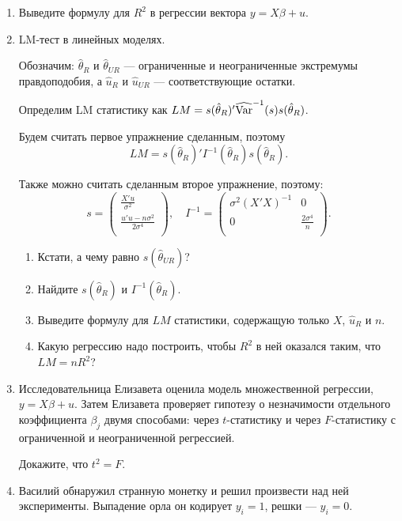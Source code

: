 \documentclass[12pt, a4paper]{article}\usepackage[]{graphicx}\usepackage[]{color}
\begin{document}
\begin{enumerate}
\item Выведите формулу для $R^2$ в регрессии вектора $y=X\beta+u$.

\item LM-тест в линейных моделях.

Обозначим: $\hat\theta_R$ и $\hat\theta_{UR}$ — ограниченные и неограниченные экстремумы правдоподобия, а $\hat u_R$ и $\hat u_{UR}$ — соответствующие остатки.

Определим LM статистику как $LM = s(\hat\theta_R)'\widehat{\operatorname{Var}}^{-1}(s)s(\hat\theta_R)$.

Будем считать первое упражнение сделанным, поэтому
\[
LM = s(\hat\theta_R)'I^{-1}(\hat\theta_R)s(\hat\theta_R).
\]

Также можно считать сделанным второе упражнение, поэтому:
\[
s=\begin{pmatrix}
\frac{X'u}{\sigma^2} \\
\frac{u'u - n\sigma^2}{2\sigma^4} \\
\end{pmatrix}, \quad
I^{-1} =
\begin{pmatrix}
\sigma^2(X'X)^{-1} & 0 \\
0 & \frac{2\sigma^4}{n} \\
\end{pmatrix}.
\]

\begin{enumerate}
\item Кстати, а чему равно $s(\hat\theta_{UR})$?
\item Найдите $s(\hat\theta_R)$ и $I^{-1}(\hat\theta_R)$.
\item Выведите формулу для $LM$ статистики, содержащую только $X$, $\hat u_R$ и $n$.
\item Какую регрессию надо построить, чтобы $R^2$ в ней оказался таким, что $LM=nR^2$?
\end{enumerate}


\item Исследовательница Елизавета оценила модель множественной регрессии, $y=X\beta + u$. Затем Елизавета проверяет гипотезу о незначимости отдельного коэффициента $\beta_j$ двумя способами: через $t$-статистику и через $F$-статистику с ограниченной и неограниченной регрессией.

Докажите, что $t^2 = F$.


\item Василий обнаружил странную монетку и решил произвести над ней эксперименты. Выпадение орла он кодирует $y_i=1$, решки — $y_i=0$.


\end{enumerate}
\end{document}
